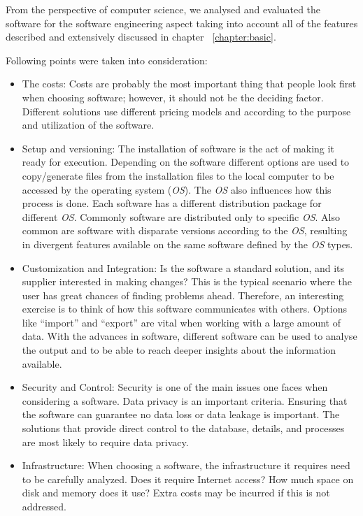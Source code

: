 From the perspective of computer science, we analysed and evaluated the software for the software engineering aspect taking into account all of the features described and extensively discussed in chapter ~\ref{chapter:basic}.

Following points were taken into consideration:
\begin{itemize}
\item The costs: Costs are probably the most important thing that people look first when choosing software; however, it should not be the deciding factor. Different solutions use different pricing models and according to the purpose and utilization of the software.

\item Setup and versioning: The installation of software is the act of making it ready for execution. Depending on the software different options are used to copy/generate files from the installation files to the local computer to be accessed by the operating system (\emph{OS}). The \emph{OS} also influences how this process is done. Each software has a different distribution package for different \emph{OS}. Commonly software are distributed only to specific \emph{OS}. Also common are software with disparate versions according to the \emph{OS}, resulting in divergent features available on the same software defined by the \emph{OS} types.

\item Customization and Integration: Is the software a standard solution, and its supplier interested in making changes? This is the typical scenario where the user has great chances of finding problems ahead. Therefore, an interesting exercise is to think of how this software communicates with others. Options like  ``import'' and ``export'' are vital when working with a large amount of data. With the advances in software, different software can be used to analyse the output and to be able to reach deeper insights about the information available. 

\item Security and Control: Security is one of the main issues one faces when considering a software. Data privacy is an important criteria. Ensuring that the software can guarantee no data loss or data leakage is important. The solutions that provide direct control to the database, details, and processes are most likely to require data privacy.

\item Infrastructure: When choosing a software, the infrastructure it requires need to be carefully analyzed. Does it require Internet access? How much space on disk and memory does it use? Extra costs may be incurred if this is not addressed.


\end{itemize}
